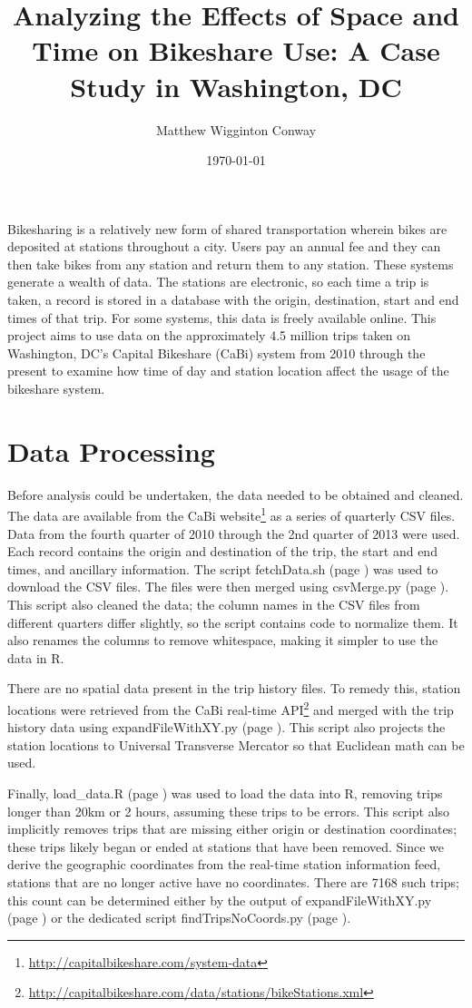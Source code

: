 \documentclass[letterpaper,11pt]{article}
\title{Analyzing the Effects of Space and Time on Bikeshare Use: A Case Study in Washington, DC}
\author{Matthew Wigginton Conway}
\date{\today}
\newcommand{\reflst}[1]{#1 (page \pageref{#1})}
\begin{document}
\fancyhfoffset[E,O]{0pt}
\maketitle

Bikesharing is a relatively new form of shared transportation wherein
bikes are deposited at stations throughout a city. Users pay an annual
fee and they can then take bikes from any station and return them to
any station. These systems generate a wealth of data. The stations are
electronic, so each time a trip is taken, a record is stored in a
database with the origin, destination, start and end times of that
trip. For some systems, this data is freely available online. This
project aims to use data on the approximately 4.5 million trips taken
on Washington, DC's Capital Bikeshare (CaBi) system from 2010 through the
present to examine how time of day and station location affect the
usage of the bikeshare system.

\section{Data Processing}

Before analysis could be undertaken, the data needed to be obtained
and cleaned.  The data are available from the CaBi
website\footnote{\url{http://capitalbikeshare.com/system-data}} as a
series of quarterly CSV files. Data from the fourth quarter of 2010
through the 2nd quarter of 2013 were used. Each record contains the
origin and destination of the trip, the start and end times, and
ancillary information.  The script \reflst{fetchData.sh} was used to
download the CSV files. The files were then merged using
\reflst{csvMerge.py}. This script also cleaned the data; the column
names in the CSV files from different quarters differ slightly, so the script
contains code to normalize them.  It also renames the columns to
remove whitespace, making it simpler to use the data in R.

There are no spatial data present in the trip history files. To remedy
this, station locations were retrieved from the CaBi real-time
API\footnote{\url{http://capitalbikeshare.com/data/stations/bikeStations.xml}}
and merged with the trip history data using
\reflst{expandFileWithXY.py}. This script also projects the station
locations to Universal Transverse Mercator so that Euclidean math can
be used.

Finally, \reflst{load\string_data.R} was used to load the data into R,
removing trips longer than 20km or 2 hours, assuming these trips to be
errors. This script also implicitly removes trips that are missing
either origin or destination coordinates; these trips likely began or
ended at stations that have been removed. Since we derive the
geographic coordinates from the real-time station information feed,
stations that are no longer active have no coordinates. There are 7168
such trips; this count can be determined either by the output of
\reflst{expandFileWithXY.py} or the dedicated script
\reflst{findTripsNoCoords.py}.
\end{document}
